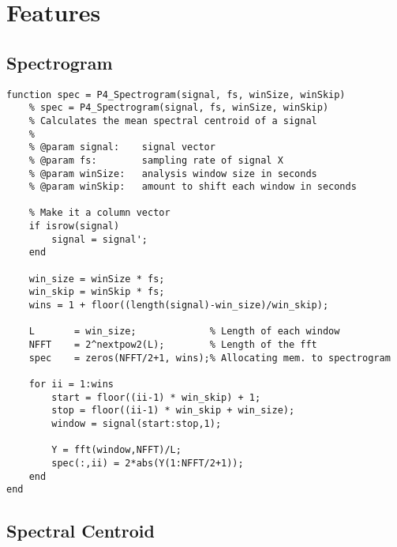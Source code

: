\section{Features}
\label{app:features}
\subsection{Spectrogram}
\label{app:feat-spectrogram}

\begin{lstlisting}[caption=Matlab implementation of calculating the spectrogram., label=snippet-spectrogram]
function spec = P4_Spectrogram(signal, fs, winSize, winSkip)
    % spec = P4_Spectrogram(signal, fs, winSize, winSkip)
    % Calculates the mean spectral centroid of a signal
    %
    % @param signal:    signal vector
    % @param fs:        sampling rate of signal X
    % @param winSize:   analysis window size in seconds
    % @param winSkip:   amount to shift each window in seconds
    
    % Make it a column vector
    if isrow(signal)
        signal = signal';
    end
    
    win_size = winSize * fs;
    win_skip = winSkip * fs;
    wins = 1 + floor((length(signal)-win_size)/win_skip);
    
    L       = win_size;             % Length of each window
    NFFT    = 2^nextpow2(L);        % Length of the fft
    spec    = zeros(NFFT/2+1, wins);% Allocating mem. to spectrogram
    
    for ii = 1:wins
        start = floor((ii-1) * win_skip) + 1;
        stop = floor((ii-1) * win_skip + win_size);
        window = signal(start:stop,1);
        
        Y = fft(window,NFFT)/L;
        spec(:,ii) = 2*abs(Y(1:NFFT/2+1));
    end
end
\end{lstlisting}

\subsection{Spectral Centroid}
\label{app:feat-centroid}

